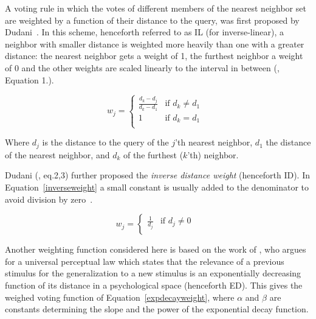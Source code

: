 \documentclass{report}
\begin{document}
A voting rule in which the votes of different members of the nearest
neighbor set are weighted by a function of their distance to the
query, was first proposed by Dudani~. In this
scheme, henceforth referred to as IL (for inverse-linear), a neighbor
with smaller distance is weighted more heavily than one with a greater
distance: the nearest neighbor gets a weight of 1, the furthest
neighbor a weight of 0 and the other weights are scaled linearly to
the interval in between (, Equation 1.).

\begin{equation}
\label{dudani_eq}
w_{j}= \left \{ \begin{array}{ll}  
                        \frac{d_{k} - d_{j}}{d_{k} - d_{1}} & \mbox{if $d_{k}
\not= d_{1}$ } \\ 
                        1 & \mbox{if $d_{k} = d_{1}$}\\
                    \end{array} 
          \right. 
\end{equation}

Where $d_{j}$ is the distance to the query of the $j$'th nearest
neighbor, $d_{1}$ the distance of the nearest neighbor, and $d_{k}$ of
the furthest ($k$'th) neighbor.

Dudani (, eq.2,3) further proposed the {\em inverse
distance weight} (henceforth ID). In Equation~\ref{inverseweight} a
small constant is usually added to the denominator to avoid division
by zero~\cite{Wettschereck94}.

\begin{equation}
\label{inverseweight}
w_{j}= \left \{ \begin{array}{ll}  
                        \frac{1}{d_{j}} & \mbox{if $d_{j} \not= 0$ } \\ 
                    \end{array} 
          \right. 
\end{equation}

Another weighting function considered here is based on the work of
, who argues for a universal perceptual law which
states that the relevance of a previous stimulus for the
generalization to a new stimulus is an exponentially decreasing
function of its distance in a psychological space (henceforth
ED). This gives the weighed voting function of
Equation~\ref{expdecayweight}, where $\alpha$ and $\beta$ are
constants determining the slope and the power of the exponential decay
function.
\end{document}
